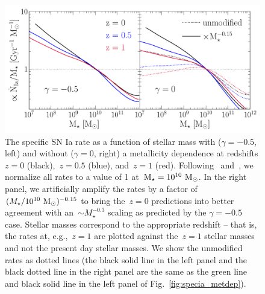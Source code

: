 \documentclass[ms.tex]{subfiles}
\begin{document}
\begin{figure}
\centering
\includegraphics[scale = 0.56]{umachine_iarate_redshiftevol.pdf}
\caption{
The specific SN Ia rate as a function of stellar mass with ($\gamma = -0.5$,
left) and without ($\gamma = 0$, right) a metallicity dependence at redshifts
$z = 0$ (black),~$z = 0.5$ (blue), and~$z = 1$ (red).
Following~\citet{Brown2019} and~\citet{Gandhi2022}, we normalize all rates to
a value of 1 at~$\text{M}_\star = 10^{10}~\text{M}_\odot$.
In the right panel, we artificially amplify the rates by a factor of
$(M_\star / 10^{10}~\text{M}_\odot)^{-0.15}$ to bring the~$z = 0$ predictions into
better agreement with an~$\sim M_\star^{-0.3}$ scaling as predicted by the
$\gamma = -0.5$ case.
Stellar masses correspond to the appropriate redshift -- that is, the rates at,
e.g.,~$z = 1$ are plotted against the~$z = 1$ stellar masses and not the
present day stellar masses.
We show the unmodified rates as dotted lines (the black solid line in the left
panel and the black dotted line in the right panel are the same as the green
line and black solid line in the left panel of Fig.~\ref{fig:specia_metdep}).
}
\label{fig:specia_zdep}
\end{figure}
\end{document}
